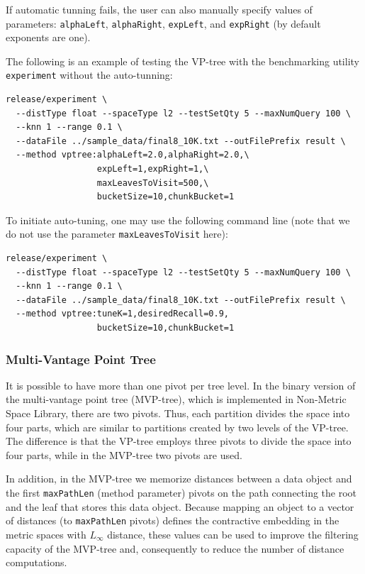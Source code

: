 \documentclass[runningheads,a4paper]{llncs}
\newcommand{\nonmetrlib}{Non-Metric Space Library}
\newcommand{\ttt}[1]{\texttt{#1}}
\begin{document}
{If automatic tunning fails,
the user can also manually specify values of  parameters:
\ttt{alphaLeft}, \ttt{alphaRight}, \ttt{expLeft}, and \ttt{expRight} (by default exponents are one).

The following is an example of testing the VP-tree with the benchmarking utility \ttt{experiment}
without the auto-tunning:
{
\footnotesize
\begin{verbatim}
release/experiment \
  --distType float --spaceType l2 --testSetQty 5 --maxNumQuery 100 \
  --knn 1 --range 0.1 \
  --dataFile ../sample_data/final8_10K.txt --outFilePrefix result \
  --method vptree:alphaLeft=2.0,alphaRight=2.0,\
                  expLeft=1,expRight=1,\
                  maxLeavesToVisit=500,\
                  bucketSize=10,chunkBucket=1
\end{verbatim}
}

To initiate auto-tuning, one may use the following command line (note that we do 
not use the parameter \texttt{maxLeavesToVisit} here):
{
\footnotesize
\begin{verbatim}
release/experiment \
  --distType float --spaceType l2 --testSetQty 5 --maxNumQuery 100 \
  --knn 1 --range 0.1 \
  --dataFile ../sample_data/final8_10K.txt --outFilePrefix result \
  --method vptree:tuneK=1,desiredRecall=0.9,
                  bucketSize=10,chunkBucket=1
\end{verbatim}
}

\subsubsection{Multi-Vantage Point Tree}
It is possible to have more than one pivot per tree level.
In the binary version of the multi-vantage point tree (MVP-tree),
which is implemented in \nonmetrlib,
there are two pivots.
Thus, each partition divides the space into four parts,
which are similar to partitions created by two levels of the VP-tree.
The difference is that the VP-tree employs three pivots
to divide the space into four parts,
while in the MVP-tree two pivots are used.

In addition, in the MVP-tree we memorize 
distances between a data object and the first \ttt{maxPathLen} (method parameter)
pivots on the path connecting the root and the leaf that stores this data object.
Because mapping an object to a vector of distances (to \ttt{maxPathLen} pivots)
defines the contractive embedding in the metric spaces with $L_{\infty}$ distance,
these values can be used to improve the filtering capacity of the MVP-tree
and, consequently to reduce the number of distance computations.

}
\end{document}
